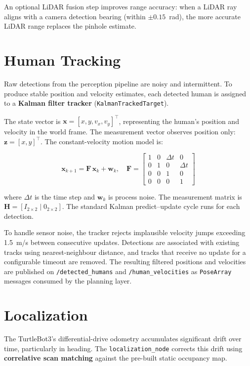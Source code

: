 \documentclass[a4paper]{article}
\begin{document}
An optional LiDAR fusion step improves range accuracy: when a LiDAR ray aligns with a camera detection bearing (within $\pm 0.15$~rad), the more accurate LiDAR range replaces the pinhole estimate.


\section{Human Tracking}

Raw detections from the perception pipeline are noisy and intermittent. To produce stable position and velocity estimates, each detected human is assigned to a \textbf{Kalman filter tracker} (\texttt{KalmanTrackedTarget}).

The state vector is $\mathbf{x} = [x, y, v_x, v_y]^\top$, representing the human's position and velocity in the world frame. The measurement vector observes position only: $\mathbf{z} = [x, y]^\top$. The constant-velocity motion model is:

\begin{equation}
    \mathbf{x}_{k+1} = \mathbf{F} \, \mathbf{x}_k + \mathbf{w}_k, \quad
    \mathbf{F} = \begin{bmatrix} 1 & 0 & \Delta t & 0 \\ 0 & 1 & 0 & \Delta t \\ 0 & 0 & 1 & 0 \\ 0 & 0 & 0 & 1 \end{bmatrix}
\end{equation}

where $\Delta t$ is the time step and $\mathbf{w}_k$ is process noise. The measurement matrix is $\mathbf{H} = [I_{2 \times 2} \mid 0_{2 \times 2}]$. The standard Kalman predict--update cycle runs for each detection.

To handle sensor noise, the tracker rejects implausible velocity jumps exceeding 1.5~m/s between consecutive updates. Detections are associated with existing tracks using nearest-neighbour distance, and tracks that receive no update for a configurable timeout are removed. The resulting filtered positions and velocities are published on \texttt{/detected\_humans} and \texttt{/human\_velocities} as \texttt{PoseArray} messages consumed by the planning layer.


\section{Localization}

The TurtleBot3's differential-drive odometry accumulates significant drift over time, particularly in heading. The \texttt{localization\_node} corrects this drift using \textbf{correlative scan matching} against the pre-built static occupancy map.
\end{document}
